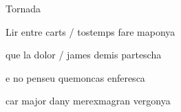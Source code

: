 \documentclass[12pt]{article}
\begin{document}
\begin{estrofaExtra}%




\begin{tornada}

Tornada

\end{tornada}


\end{estrofaExtra}


\begin{estrofa}

 Lir entre carts / tostemps fare maponya

 que la dolor / james demis partescha

 e no penseu quemoncas enferesca

 car major dany merexmagran vergonya

\end{estrofa}
\end{document}
